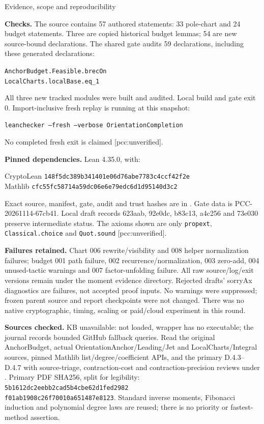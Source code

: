 \documentclass[10pt]{article}
\begin{document}
\newpage
\begin{center}{\Large Evidence, scope and reproducibility}\end{center}
\textbf{Checks.} The source contains 57 authored statements: 33 pole-chart
and 24 budget statements. Three are copied historical budget lemmas; 54 are
new source-bound declarations. The shared gate audits 59 declarations,
including these generated declarations:
\begin{center}\texttt{AnchorBudget.Feasible.brecOn}\\
\texttt{LocalCharts.localBase.eq\_1}\end{center}
All three new tracked modules were built and audited. Local build and gate
exit 0. Import-inclusive fresh replay is running at this snapshot:
\begin{center}\texttt{leanchecker --fresh --verbose OrientationCompletion}\end{center}
No completed fresh exit is claimed [pcc:unverified].

\textbf{Pinned dependencies.} Lean 4.35.0, with:
\begin{center}\small
CryptoLean \texttt{148f5dc389b341401e06d76abe7783c4ccf42f2e}\\
Mathlib \texttt{cfc55fc58714a59dc06e6e79edc6d1d95140d3c2}
\end{center}
Exact source, manifest, gate, audit and trust hashes are in
. Gate data is PCC-20261114-67cb41.
Local draft records 623aab, 92e0dc, b83c13, a4c256 and 73e030 preserve
intermediate status. The axioms shown are only \texttt{propext},
\texttt{Classical.choice} and \texttt{Quot.sound} [pcc:unverified].

\textbf{Failures retained.} Chart 006 rewrite/visibility and 008 helper
normalization failures; budget 001 path failure, 002 recurrence/normalization,
003 zero-add, 004 unused-tactic warnings and 007 factor-unfolding failure.
All raw source/log/exit versions remain under the moment evidence directory.
Rejected drafts' sorryAx diagnostics are failures, not accepted proof inputs.
No warnings were suppressed; frozen parent source and report checkpoints
were not changed. There was no native cryptographic, timing, scaling or
paid/cloud experiment in this round.

\textbf{Sources checked.} KB unavailable: not loaded, wrapper has no
executable; the journal records bounded GitHub fallback queries. Read the
original AnchorBudget, actual OrientationAnchor/Leading/Jet and
LocalCharts/Integral sources, pinned Mathlib list/degree/coefficient APIs,
and the primary D.4.3--D.4.7 with source-triage, contraction-cost and
contraction-precision reviews under
.
Primary PDF SHA256, split for legibility:
\texttt{5b1612dc2eebb2cad5b4cbe62d1fed2982}\\
\texttt{f01ab1908c26f70010a651487e8123}.
Standard inverse moments, Fibonacci induction and polynomial degree laws
are reused; there is no priority or fastest-method assertion.
\end{document}
